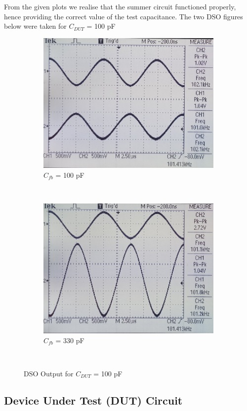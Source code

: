 \documentclass[12pt]{article}
\begin{document}
From the given plots we realise that the summer circuit functioned properly, hence providing the correct value of the test capacitance. The two DSO figures below  were taken for \(C_{DUT}\) = 100 pF
\begin{center}
\begin{figure}[H]
	\begin{subfigure}[b]{\linewidth}
	   	\includegraphics[width = 0.65\linewidth, trim = {0 0 0 0}, clip]{14_56_42.jpg}
		\caption{\(C_{fb}\) = 100 pF}
	\end{subfigure}\\
	\begin{subfigure}[b]{\linewidth}
	   	\includegraphics[width = 0.65\linewidth, trim = {0 0 0 0}, clip]{14_57_31.jpg}
		\caption{\(C_{fb}\) = 330 pF}
	\end{subfigure}\\
	\caption{DSO Output for \(C_{DUT}\) = 100 pF}
\end{figure}
\end{center}

\subsection{Device Under Test (DUT) Circuit}
\end{document}
